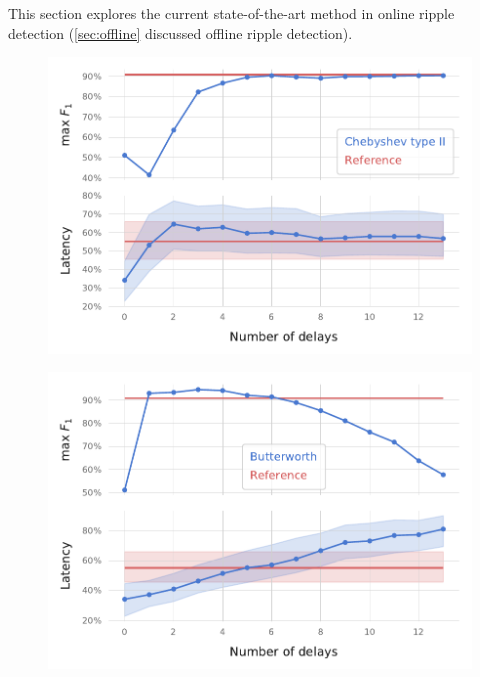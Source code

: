 \label{sec:SOTA}

This section explores the current state-of-the-art method in online ripple detection (\cref{sec:offline} discussed offline ripple detection). 

\clearpage
\begin{figure}
\includegraphics{figures/searcharray-cheby2}
\end{figure}

\begin{figure}
\includegraphics{figures/searcharray-butter}
\end{figure}
